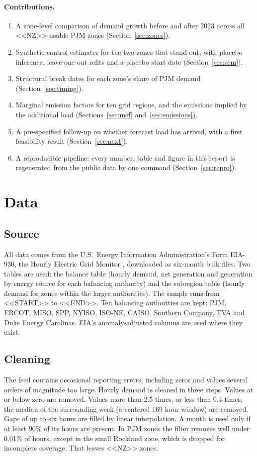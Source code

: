 \documentclass[11pt,a4paper]{article}
\begin{document}
\paragraph{Contributions.}
\begin{enumerate}[label=(\roman*)]
\item A zone-level comparison of demand growth before and after 2023 across all <<NZ>> usable PJM zones (Section~\ref{sec:zones}).
\item Synthetic control estimates for the two zones that stand out, with placebo inference, leave-one-out refits and a placebo start date (Section~\ref{sec:scm}).
\item Structural break dates for each zone's share of PJM demand (Section~\ref{sec:timing}).
\item Marginal emission factors for ten grid regions, and the emissions implied by the additional load (Sections~\ref{sec:mef} and~\ref{sec:emissions}).
\item A pre-specified follow-up on whether forecast load has arrived, with a first feasibility result (Section~\ref{sec:next}).
\item A reproducible pipeline: every number, table and figure in this report is regenerated from the public data by one command (Section~\ref{sec:repro}).
\end{enumerate}

\section{Data}

\subsection{Source}
All data comes from the U.S.\ Energy Information Administration's Form EIA-930, the Hourly Electric Grid Monitor \cite{eia930}, downloaded as six-month bulk files. Two tables are used: the balance table (hourly demand, net generation and generation by energy source for each balancing authority) and the subregion table (hourly demand for zones within the larger authorities). The sample runs from <<START>> to <<END>>. Ten balancing authorities are kept: PJM, ERCOT, MISO, SPP, NYISO, ISO-NE, CAISO, Southern Company, TVA and Duke Energy Carolinas. EIA's anomaly-adjusted columns are used where they exist.

\subsection{Cleaning}
The feed contains occasional reporting errors, including zeros and values several orders of magnitude too large. Hourly demand is cleaned in three steps. Values at or below zero are removed. Values more than 2.5 times, or less than 0.4 times, the median of the surrounding week (a centered 169-hour window) are removed. Gaps of up to six hours are filled by linear interpolation. A month is used only if at least 90\% of its hours are present. In PJM zones the filter removes well under 0.01\% of hours, except in the small Rockland zone, which is dropped for incomplete coverage. That leaves <<NZ>> zones.
\end{document}
